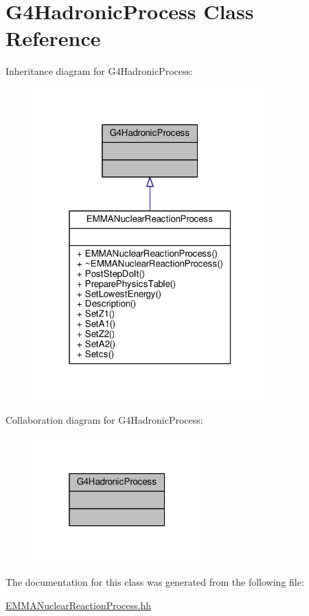 \hypertarget{classG4HadronicProcess}{}\section{G4\+Hadronic\+Process Class Reference}
\label{classG4HadronicProcess}


Inheritance diagram for G4\+Hadronic\+Process\+:
\nopagebreak
\begin{figure}[H]
\begin{center}
\leavevmode
\includegraphics[width=256pt]{classG4HadronicProcess__inherit__graph}
\end{center}
\end{figure}


Collaboration diagram for G4\+Hadronic\+Process\+:
\nopagebreak
\begin{figure}[H]
\begin{center}
\leavevmode
\includegraphics[width=184pt]{classG4HadronicProcess__coll__graph}
\end{center}
\end{figure}


The documentation for this class was generated from the following file\+:\begin{DoxyCompactItemize}
\item 
\hyperlink{EMMANuclearReactionProcess_8hh}{E\+M\+M\+A\+Nuclear\+Reaction\+Process.\+hh}\end{DoxyCompactItemize}
